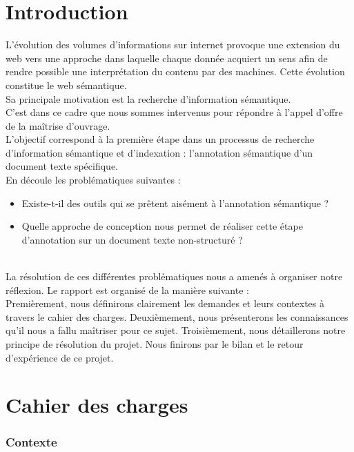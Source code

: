 \documentclass[a4paper, 11pt]{report}
\begin{document}
\part{Introduction}
L'évolution des volumes d'informations sur internet provoque une extension du web vers une approche dans laquelle chaque donnée acquiert un sens afin de rendre possible une interprétation du contenu par des machines. Cette évolution constitue le web sémantique.\\
Sa principale motivation  est la recherche d’information sémantique.\\

C'est dans ce cadre que nous sommes intervenus pour répondre à l'appel d'offre de la maîtrise d'ouvrage. \\
L'objectif correspond à la première étape dans un processus de recherche d'information sémantique et d'indexation : l'annotation sémantique d'un document texte spécifique.\\

En découle les problématiques suivantes :
\begin{itemize}
\item Existe-t-il des outils qui se prêtent aisément à l'annotation sémantique ?
\item Quelle approche de conception nous permet de réaliser cette étape d'annotation sur un document texte non-structuré ?
\end{itemize}
    ~\\
    
La résolution de ces différentes problématiques nous a amenés à organiser notre réflexion. Le rapport est organisé de la manière suivante : \\
Premièrement, nous définirons clairement les demandes et leurs contextes à travers le cahier des charges. Deuxièmement, nous présenterons les connaissances qu'il nous a fallu maîtriser pour ce sujet. Troisièmement, nous détaillerons notre principe de résolution du projet. Nous finirons par le bilan et le retour d’expérience de ce projet.
\part{Cahier des charges}
    \section{Contexte}
\end{document}
